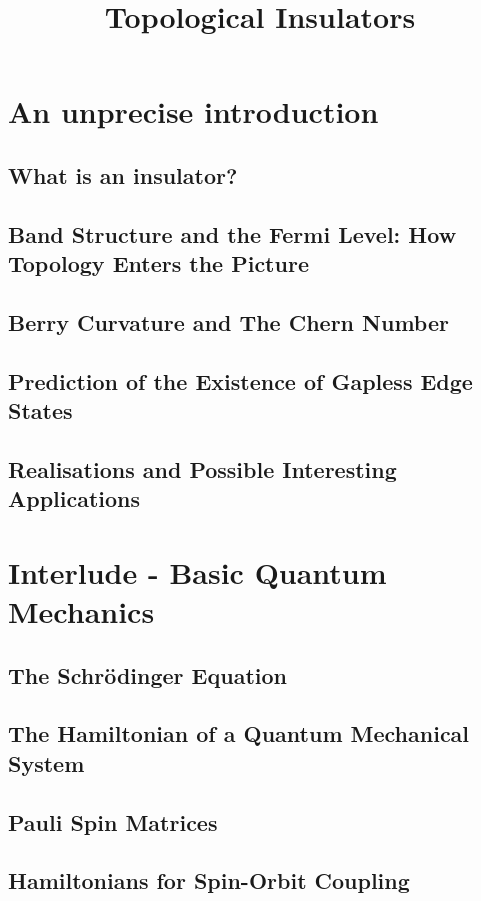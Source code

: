 \documentclass[a4paper]{article}
\title{Topological Insulators}
\begin{document}
    \maketitle
    \tableofcontents
    \newpage

    \section{An unprecise introduction}
    \subsection{What is an insulator?}
    \subsection{Band Structure and the Fermi Level: How Topology Enters the Picture}
    \subsection{Berry Curvature and The Chern Number}
    \subsection{Prediction of the Existence of Gapless Edge States}
    \subsection{Realisations and Possible Interesting Applications}
    \section{Interlude - Basic Quantum Mechanics}
    \subsection{The Schrödinger Equation}
    \subsection{The Hamiltonian of a Quantum Mechanical System}
    \subsection{Pauli Spin Matrices}
    \subsection{Hamiltonians for Spin-Orbit Coupling}
\end{document}
